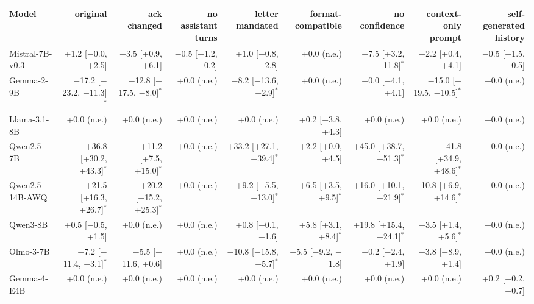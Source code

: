 \begin{tabular}{lrrrrrrrr}
\toprule
Model & original & ack changed & no assistant turns & letter mandated & format-compatible & no confidence & context-only prompt & self-generated history \\
\midrule
Mistral-7B-v0.3 & +1.2 [$-$0.0, +2.5] & +3.5 [+0.9, +6.1] & $-$0.5 [$-$1.2, +0.2] & +1.0 [$-$0.8, +2.8] & +0.0 (n.e.) & +7.5 [+3.2, +11.8]$^{*}$ & +2.2 [+0.4, +4.1] & $-$0.5 [$-$1.5, +0.5] \\
Gemma-2-9B & $-$17.2 [$-$23.2, $-$11.3]$^{*}$ & $-$12.8 [$-$17.5, $-$8.0]$^{*}$ & +0.0 (n.e.) & $-$8.2 [$-$13.6, $-$2.9]$^{*}$ & +0.0 (n.e.) & +0.0 [$-$4.1, +4.1] & $-$15.0 [$-$19.5, $-$10.5]$^{*}$ & +0.0 (n.e.) \\
Llama-3.1-8B & +0.0 (n.e.) & +0.0 (n.e.) & +0.0 (n.e.) & +0.0 (n.e.) & +0.2 [$-$3.8, +4.3] & +0.0 (n.e.) & +0.0 (n.e.) & +0.0 (n.e.) \\
Qwen2.5-7B & +36.8 [+30.2, +43.3]$^{*}$ & +11.2 [+7.5, +15.0]$^{*}$ & +0.0 (n.e.) & +33.2 [+27.1, +39.4]$^{*}$ & +2.2 [+0.0, +4.5] & +45.0 [+38.7, +51.3]$^{*}$ & +41.8 [+34.9, +48.6]$^{*}$ & +0.0 (n.e.) \\
Qwen2.5-14B-AWQ & +21.5 [+16.3, +26.7]$^{*}$ & +20.2 [+15.2, +25.3]$^{*}$ & +0.0 (n.e.) & +9.2 [+5.5, +13.0]$^{*}$ & +6.5 [+3.5, +9.5]$^{*}$ & +16.0 [+10.1, +21.9]$^{*}$ & +10.8 [+6.9, +14.6]$^{*}$ & +0.0 (n.e.) \\
Qwen3-8B & +0.5 [$-$0.5, +1.5] & +0.0 (n.e.) & +0.0 (n.e.) & +0.8 [$-$0.1, +1.6] & +5.8 [+3.1, +8.4]$^{*}$ & +19.8 [+15.4, +24.1]$^{*}$ & +3.5 [+1.4, +5.6]$^{*}$ & +0.0 (n.e.) \\
Olmo-3-7B & $-$7.2 [$-$11.4, $-$3.1]$^{*}$ & $-$5.5 [$-$11.6, +0.6] & +0.0 (n.e.) & $-$10.8 [$-$15.8, $-$5.7]$^{*}$ & $-$5.5 [$-$9.2, $-$1.8] & $-$0.2 [$-$2.4, +1.9] & $-$3.8 [$-$8.9, +1.4] & +0.0 (n.e.) \\
Gemma-4-E4B & +0.0 (n.e.) & +0.0 (n.e.) & +0.0 (n.e.) & +0.0 (n.e.) & +0.0 (n.e.) & +0.0 (n.e.) & +0.0 (n.e.) & +0.2 [$-$0.2, +0.7] \\
\bottomrule
\end{tabular}
